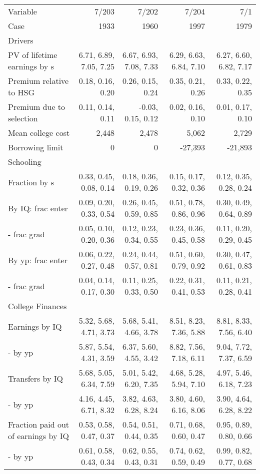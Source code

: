 \begin{tabular}{lrrrr}
\hline
Variable & 7/203  & 7/202  & 7/204  & 7/1  \\ 
Case & 1933  & 1960  & 1997  & 1979  \\ 
Drivers &   &   &   &   \\ 
PV of lifetime earnings by s & 6.71, 6.89, 7.05, 7.25  & 6.67, 6.93, 7.08, 7.33  & 6.29, 6.63, 6.84, 7.10  & 6.27, 6.60, 6.82, 7.17  \\ 
Premium relative to HSG & 0.18, 0.16, 0.20  & 0.26, 0.15, 0.24  & 0.35, 0.21, 0.26  & 0.33, 0.22, 0.35  \\ 
Premium due to selection & 0.11, 0.14, 0.11  & -0.03, 0.15, 0.12  & 0.02, 0.16, 0.10  & 0.01, 0.17, 0.10  \\ 
Mean college cost & 2,448  & 2,478  & 5,062  & 2,729  \\ 
Borrowing limit & 0  & 0  & -27,393  & -21,893  \\ 
\hline
Schooling &   &   &   &   \\ 
Fraction by s & 0.33, 0.45, 0.08, 0.14  & 0.18, 0.36, 0.19, 0.26  & 0.15, 0.17, 0.32, 0.36  & 0.12, 0.35, 0.28, 0.24  \\ 
By IQ: frac enter & 0.09, 0.20, 0.33, 0.54  & 0.26, 0.45, 0.59, 0.85  & 0.51, 0.78, 0.86, 0.96  & 0.30, 0.49, 0.64, 0.89  \\ 
- frac grad & 0.05, 0.10, 0.20, 0.36  & 0.12, 0.23, 0.34, 0.55  & 0.23, 0.36, 0.45, 0.58  & 0.11, 0.20, 0.29, 0.45  \\ 
By yp: frac enter & 0.06, 0.22, 0.27, 0.48  & 0.24, 0.44, 0.57, 0.81  & 0.51, 0.60, 0.79, 0.92  & 0.30, 0.47, 0.61, 0.83  \\ 
- frac grad & 0.04, 0.14, 0.17, 0.30  & 0.11, 0.25, 0.33, 0.50  & 0.22, 0.31, 0.41, 0.53  & 0.11, 0.21, 0.28, 0.41  \\ 
\hline
College Finances &   &   &   &   \\ 
Earnings by IQ & 5.32, 5.68, 4.71, 3.73  & 5.68, 5.41, 4.66, 3.78  & 8.51, 8.23, 7.36, 5.88  & 8.81, 8.33, 7.56, 6.40  \\ 
- by yp & 5.87, 5.54, 4.31, 3.59  & 6.37, 5.60, 4.55, 3.42  & 8.82, 7.56, 7.18, 6.11  & 9.04, 7.72, 7.37, 6.59  \\ 
Transfers by IQ & 5.68, 5.05, 6.34, 7.59  & 5.01, 5.42, 6.20, 7.35  & 4.68, 5.28, 5.94, 7.10  & 4.97, 5.46, 6.18, 7.23  \\ 
- by yp & 4.16, 4.45, 6.71, 8.32  & 3.82, 4.63, 6.28, 8.24  & 3.80, 4.60, 6.16, 8.06  & 3.90, 4.64, 6.28, 8.22  \\ 
Fraction paid out of earnings by IQ & 0.53, 0.58, 0.47, 0.37  & 0.54, 0.51, 0.44, 0.35  & 0.71, 0.68, 0.60, 0.47  & 0.95, 0.89, 0.80, 0.66  \\ 
- by yp & 0.61, 0.58, 0.43, 0.34  & 0.62, 0.55, 0.43, 0.31  & 0.74, 0.62, 0.59, 0.49  & 0.99, 0.82, 0.77, 0.68  \\ 
\hline
\end{tabular}%
